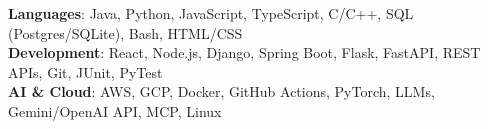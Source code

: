 \begin{itemize}[leftmargin=0.15in, label={}]
    \small{\item{
     \textbf{Languages}{: Java, Python, JavaScript, TypeScript, C/C++, SQL (Postgres/SQLite), Bash, HTML/CSS} \\
     \textbf{Development}{: React, Node.js, Django, Spring Boot, Flask, FastAPI, REST APIs, Git, JUnit, PyTest} \\
     \textbf{AI \& Cloud}{: AWS, GCP, Docker, GitHub Actions, PyTorch, LLMs, Gemini/OpenAI API, MCP, Linux}
    }}
\end{itemize}
